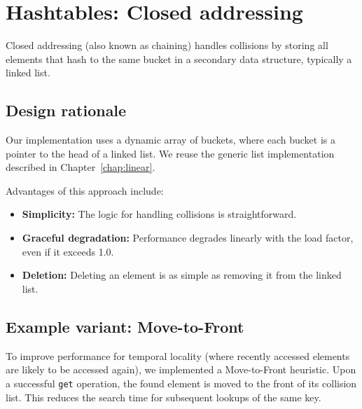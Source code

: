 \chapter{Hashtables: Closed addressing}\label{chap:hashtables:closed}

Closed addressing (also known as chaining) handles collisions by storing all elements that hash to the same bucket in a secondary data structure, typically a linked list.

\section{Design rationale}

Our implementation uses a dynamic array of buckets, where each bucket is a pointer to the head of a linked list. We reuse the generic list implementation described in Chapter~\ref{chap:linear}.

Advantages of this approach include:
\begin{itemize}
    \item \textbf{Simplicity:} The logic for handling collisions is straightforward.
    \item \textbf{Graceful degradation:} Performance degrades linearly with the load factor, even if it exceeds 1.0.
    \item \textbf{Deletion:} Deleting an element is as simple as removing it from the linked list.
\end{itemize}

\section{Example variant: Move-to-Front}

To improve performance for temporal locality (where recently accessed elements are likely to be accessed again), we implemented a Move-to-Front heuristic. Upon a successful \texttt{get} operation, the found element is moved to the front of its collision list. This reduces the search time for subsequent lookups of the same key.

